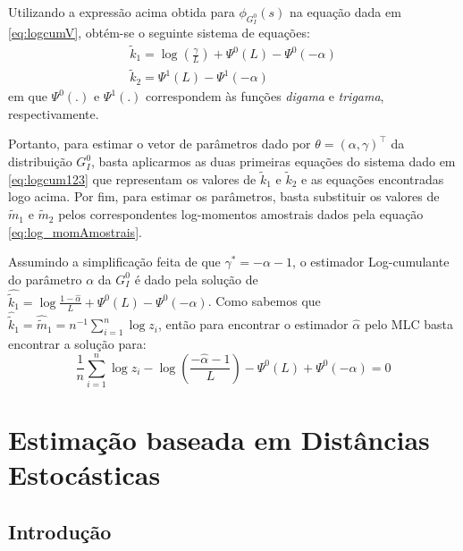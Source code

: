 Utilizando a expressão acima obtida para $\phi_{G_I^0}(s)$ na equação dada em \eqref{eq:logcumV}, obtém-se o seguinte sistema de equações:
\begin{equation}
    \begin{matrix}
        \widetilde{k}_{1} = \log \left ( \frac{\gamma}{L} \right ) + \Psi^{0}(L) - \Psi^{0}(-\alpha)  \\ 
        \widetilde{k}_{2} = \Psi^{1}(L) - \Psi^{1}(-\alpha)
    \end{matrix}
\end{equation}
em que $\Psi^{0}(.)$ e $\Psi^{1}(.)$ correspondem às funções \textit{digama} e \textit{trigama}, respectivamente.

Portanto, para estimar o vetor de parâmetros dado por $\theta = (\alpha, \gamma)^{\top}$ da distribuição $G_I^0$, basta aplicarmos as duas primeiras equações do sistema dado em \eqref{eq:logcum123} que representam os valores de $\widetilde{k}_{1}$ e $\widetilde{k}_{2}$ e as equações encontradas logo acima. Por fim, para estimar os parâmetros, basta substituir os valores de $\widetilde{m}_{1}$ e $\widetilde{m}_{2}$ pelos correspondentes log-momentos amostrais dados pela equação \eqref{eq:log_momAmostrais}. 

Assumindo a simplificação feita de que $\gamma^{*} = -\alpha - 1$, o estimador Log-cumulante do parâmetro $\alpha$ da $G_I^0$ é dado pela solução de $\widehat{\widetilde{k}_{1}} = \log \frac{1-\widehat{\alpha}}{L} + \Psi^{0}(L) - \Psi^{0}(-\alpha)$. Como sabemos que $\widehat{\widetilde{k}}_{1} = \widehat{\widetilde{m}}_{1} = n^{-1}\sum_{i=1}^{n}\log z_i$, então para encontrar o estimador $\widehat{\alpha}$ pelo MLC basta encontrar a solução para:
\begin{equation}
    \frac{1}{n}\sum_{i=1}^{n}\log z_i - \log \left ( \frac{-\widehat{\alpha}-1}{L} \right ) - \Psi^{0}(L) + \Psi^{0}(-\alpha) = 0
    \label{eq:alphaEst_logCum}
\end{equation}

\section{Estimação baseada em Distâncias Estocásticas}

\subsection{Introdução}

